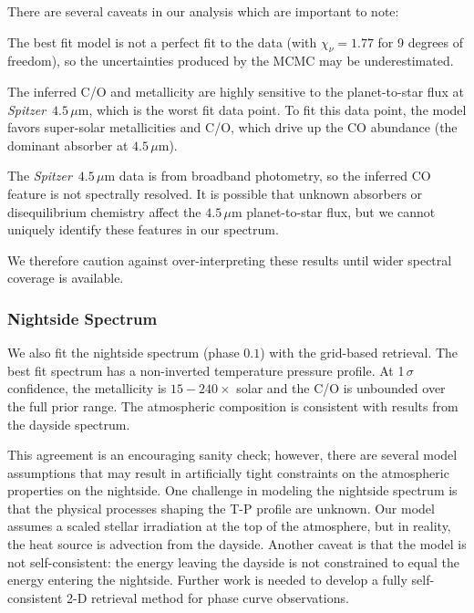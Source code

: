 \documentclass[twocolumn, trackchanges]{aastex61}
\newcommand{\project}[1]{\textsl{#1}}
\newcommand{\Spitzer}{\project{Spitzer}}
\newenvironment{my_itemize}{
    \begin{itemize}
              \setlength{\itemsep}{1pt}
                    \setlength{\parskip}{0pt}
                      \setlength{\parsep}{0pt}}{\end{itemize}
                      }
\begin{document}
There are several caveats in our analysis which are important to note:
\begin{my_itemize}
    \item {The best fit model is not a perfect fit to the data (with $\chi_\nu = 1.77$ for 9 degrees of freedom), so the uncertainties produced by the MCMC may be underestimated.} 
    \item {The inferred C/O and metallicity are highly sensitive to the planet-to-star flux at \Spitzer\ $4.5\,\mu$m, which is the worst fit data point. To fit this data point, the model favors super-solar metallicities and C/O, which drive up the CO abundance (the dominant absorber at $4.5\,\mu$m).}
    \item{The \Spitzer\ $4.5\,\mu$m data is from broadband photometry, so the inferred CO feature is not spectrally resolved. It is possible that unknown absorbers or disequilibrium chemistry affect the $4.5\,\mu$m planet-to-star flux, but we cannot uniquely identify these features in our spectrum.}
\end{my_itemize}
We therefore caution against over-interpreting these results until wider spectral coverage is available.


\subsubsection{Nightside Spectrum}
We also fit the nightside spectrum (phase $0.1$) with the grid-based retrieval.
The best fit spectrum has a non-inverted temperature pressure profile.  At
1\,$\sigma$ confidence, the metallicity is $15 - 240\times$ solar and the C/O is
unbounded over the full prior range. The atmospheric composition is consistent
with results from the dayside spectrum. 

This agreement is an encouraging sanity check; however, there are several model assumptions that may result in artificially tight constraints on the atmospheric properties on the nightside.  One challenge in modeling the nightside spectrum is that the physical processes shaping the T-P profile are unknown.  Our model assumes a scaled stellar irradiation at the top of the atmosphere, but in reality, the heat source is advection from the dayside. Another caveat is that the model is not self-consistent: the energy leaving the dayside is not constrained to equal the energy entering the nightside.  Further work is needed to develop a fully self-consistent 2-D retrieval method for phase curve observations. 
\end{document}
